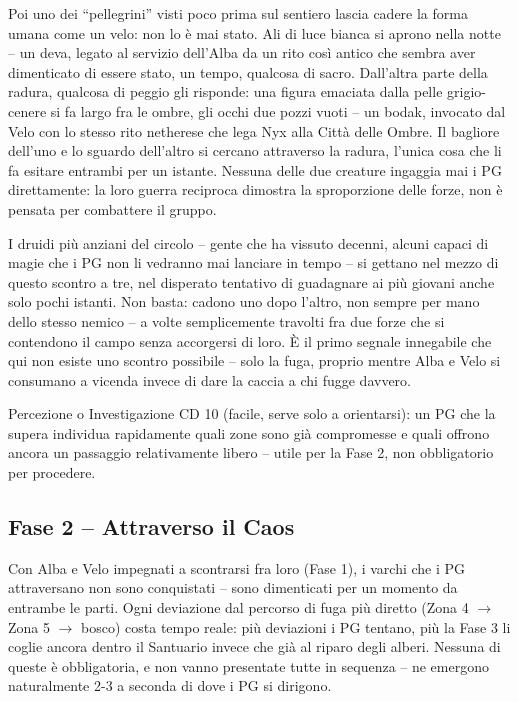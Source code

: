Poi uno dei ``pellegrini'' visti poco prima sul sentiero lascia cadere la forma umana come un velo: non lo è mai stato. Ali di luce bianca si aprono nella notte -- un deva, legato al servizio dell'Alba da un rito così antico che sembra aver dimenticato di essere stato, un tempo, qualcosa di sacro. Dall'altra parte della radura, qualcosa di peggio gli risponde: una figura emaciata dalla pelle grigio-cenere si fa largo fra le ombre, gli occhi due pozzi vuoti -- un bodak, invocato dal Velo con lo stesso rito netherese che lega Nyx alla Città delle Ombre. Il bagliore dell'uno e lo sguardo dell'altro si cercano attraverso la radura, l'unica cosa che li fa esitare entrambi per un istante. Nessuna delle due creature ingaggia mai i PG direttamente: la loro guerra reciproca dimostra la sproporzione delle forze, non è pensata per combattere il gruppo.

I druidi più anziani del circolo -- gente che ha vissuto decenni, alcuni capaci di magie che i PG non li vedranno mai lanciare in tempo -- si gettano nel mezzo di questo scontro a tre, nel disperato tentativo di guadagnare ai più giovani anche solo pochi istanti. Non basta: cadono uno dopo l'altro, non sempre per mano dello stesso nemico -- a volte semplicemente travolti fra due forze che si contendono il campo senza accorgersi di loro. È il primo segnale innegabile che qui non esiste uno scontro possibile -- solo la fuga, proprio mentre Alba e Velo si consumano a vicenda invece di dare la caccia a chi fugge davvero.

Percezione o Investigazione CD 10 (facile, serve solo a orientarsi): un PG che la supera individua rapidamente quali zone sono già compromesse e quali offrono ancora un passaggio relativamente libero -- utile per la Fase 2, non obbligatorio per procedere.

\subsection{Fase 2 -- Attraverso il Caos}

Con Alba e Velo impegnati a scontrarsi fra loro (Fase 1), i varchi che i PG attraversano non sono conquistati -- sono dimenticati per un momento da entrambe le parti. Ogni deviazione dal percorso di fuga più diretto (Zona 4 $\to$ Zona 5 $\to$ bosco) costa tempo reale: più deviazioni i PG tentano, più la Fase 3 li coglie ancora dentro il Santuario invece che già al riparo degli alberi. Nessuna di queste è obbligatoria, e non vanno presentate tutte in sequenza -- ne emergono naturalmente 2-3 a seconda di dove i PG si dirigono.


